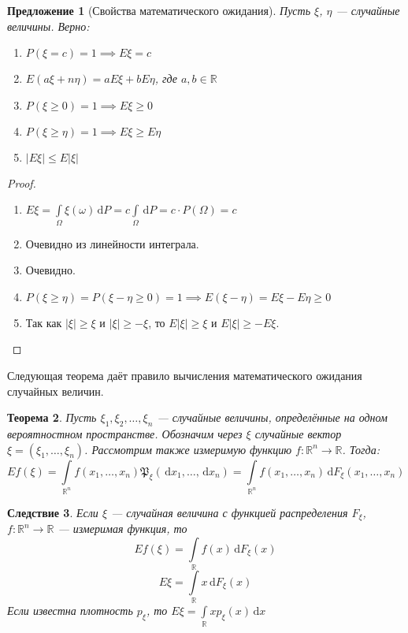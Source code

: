 \documentclass[11pt,openany,a4paper]{scrartcl}
\theoremstyle{plain}
\newtheorem{theorem}{Теорема}[section]
\newtheorem{corollary}[theorem]{Следствие}
\newtheorem{proposition}[theorem]{Предложение}
\theoremstyle{definition}
\newcommand\mb{\mathbb}
\newcommand\real{\mb R}
\newcommand{\dif}{\, \mathrm d}
\begin{document}
\begin{proposition}[Свойства математического ожидания]
Пусть $\xi$, $\eta$ — случайные величины. Верно:
    \begin{enumerate}
        \item $P(\xi = c) = 1 \implies E\xi = c$
        \item $E(a\xi + n\eta) = aE\xi + bE\eta$, где $a,b \in \real$
        \item $P(\xi \geqslant 0) = 1 \implies E\xi \geqslant 0$
        \item $P(\xi \geqslant \eta) = 1 \implies E\xi \geqslant E\eta$
        \item $|E\xi| \leqslant E|\xi|$
    \end{enumerate}
\end{proposition}
\begin{proof}
\mbox{}
    \begin{enumerate}
        \item $E\xi = \int\limits_\Omega\xi(\omega)\dif P =
        c\int\limits_\Omega \dif P = c\cdot P(\Omega) = c$
        \item Очевидно из линейности интеграла.
        \item Очевидно.
        \item $P(\xi \geqslant \eta) = P(\xi - \eta \geqslant 0) = 1 \implies
        E(\xi - \eta) = E\xi - E\eta \geqslant 0$
        \item Так как $|\xi| \geqslant \xi$ и $|\xi| \geqslant - \xi$, то
        $E|\xi| \geqslant\xi$ и $E|\xi| \geqslant - E\xi$.
    \end{enumerate}
\end{proof}

Следующая теорема даёт правило вычисления математического ожидания случайных
величин.

\begin{theorem}
    Пусть $\xi_1, \xi_2, \ldots, \xi_n$ — случайные величины, определённые на
    одном вероятностном пространстве. Обозначим через $\xi$ случайные вектор
    $\xi = (\xi_1, \ldots, \xi_n)$. Рассмотрим также измеримую функцию
    $f: \real^n \to \real$. Тогда:
    $$
    Ef(\xi) = \int\limits_{\real^n} f(x_1, \ldots, x_n)
    \mathfrak P_\xi (\dif x_1, \ldots, \dif x_n) =
    \int\limits_{\real^n} f(x_1, \ldots, x_n) \dif F_\xi(x_1, \ldots, x_n)
    $$
\end{theorem}
\begin{corollary}
    Если $\xi$ — случайная величина с функцией распределения $F_\xi$,
    $f: \real^n \to \real$ — измеримая функция, то
    $$
    Ef(\xi) = \int\limits_\real f(x) \dif F_\xi(x)
    $$
    $$
    E\xi = \int\limits_\real x \dif F_\xi(x)
    $$
    Если известна плотность $p_\xi$, то $E\xi = \int\limits_\real xp_\xi(x)\dif x$
\end{corollary}
\end{document}
